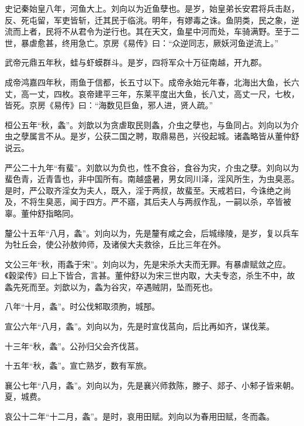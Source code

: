 \documentclass[12pt,UTF8]{ctexbook}
\begin{document}
史记秦始皇八年，河鱼大上。刘向以为近鱼孽也。是岁，始皇弟长安君将兵击赵，反、死屯留，军吏皆斩，迁其民于临洮。明年，有嫪毒之诛。鱼阴类，民之象，逆流而上者，民将不从君令为逆行也。其在天文，鱼星中河而处，车骑满野。至于二世，暴虐愈甚，终用急亡。京房《易传》曰：“众逆同志，厥妖河鱼逆流上。”



武帝元鼎五年秋，蛙与虾蟆群斗。是岁，四将军众十万征南越，开九郡。



成帝鸿嘉四年秋，雨鱼于信都，长五寸以下。成帝永始元年春，北海出大鱼，长六丈，高一丈，四枚。哀帝建平三年，东莱平度出大鱼，长八丈，高丈一尺，七枚，皆死。京房《易传》曰：“海数见巨鱼，邪人进，贤人疏。”



桓公五年“秋，螽”。刘歆以为贪虐取民则螽，介虫之孽也，与鱼同占。刘向以为介虫之孽属言不从。是岁，公获二国之聘，取鼎易邑，兴役起城。诸螽略皆从董仲舒说云。



严公二十九年“有蜚”。刘歆以为负也，性不食谷，食谷为灾，介虫之孽。刘向以为蜚色青，近青眚也，非中国所有。南越盛暑，男女同川泽，淫风所生，为虫臭恶。是时，严公取齐淫女为夫人，既入，淫于两叔，故蜚至。天戒若曰，今诛绝之尚及，不将生臭恶，闻于四方。严不寤，其后夫人与两叔作乱，一嗣以杀，卒皆被辜。董仲舒指略同。



釐公十五年“八月，螽”。刘向以为，先是釐有咸之会，后城缘陵，是岁，复以兵车为牡丘会，使公孙敖帅师，及诸侯大夫救徐，丘比三年在外。



文公三年“秋，雨螽于宋”。刘向以为，先是宋杀大夫而无罪。有暴虐赋敛之应。《穀梁传》曰上下皆合，言甚。董仲舒以为宋三世内取，大夫专恣，杀生不中，故螽先死而至。刘歆以为，螽为谷灾，卒遇贼阴，坠而死也。



八年“十月，螽”。时公伐邾取须朐，城郚。



宣公六年“八月，螽”。刘向以为，先是时宣伐莒向，后比再如齐，谋伐莱。



十三年“秋，螽”。公孙归父会齐伐莒。



十五年“秋，螽”。宣亡熟岁，数有军旅。



襄公七年“八月，螽”。刘向以为，先是襄兴师救陈，滕子、郯子、小邾子皆来朝。夏，城费。



哀公十二年“十二月，螽”。是时，哀用田赋。刘向以为春用田赋，冬而螽。
\end{document}
